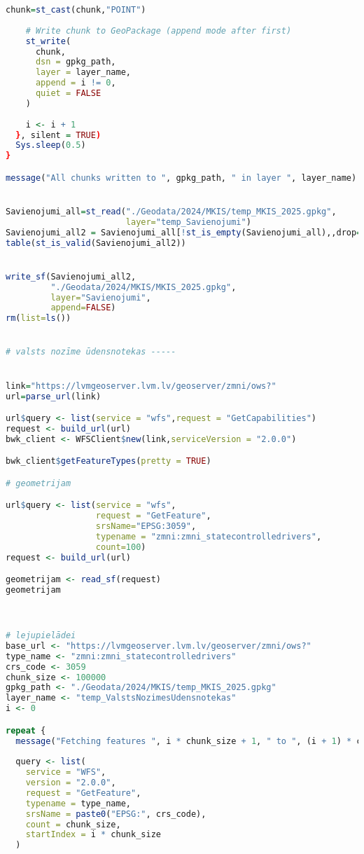 \documentclass[
]{book}
\begin{document}
\begin{lstlisting}[language=R]
    chunk=st_cast(chunk,"POINT")
    
    # Write chunk to GeoPackage (append mode after first)
    st_write(
      chunk, 
      dsn = gpkg_path,
      layer = layer_name,
      append = i != 0,
      quiet = FALSE
    )
    
    i <- i + 1
  }, silent = TRUE)
  Sys.sleep(0.5)
}

message("All chunks written to ", gpkg_path, " in layer ", layer_name)


Savienojumi_all=st_read("./Geodata/2024/MKIS/temp_MKIS_2025.gpkg",
                        layer="temp_Savienojumi")
Savienojumi_all2 = Savienojumi_all[!st_is_empty(Savienojumi_all),,drop=FALSE] # 0
table(st_is_valid(Savienojumi_all2))


write_sf(Savienojumi_all2,
         "./Geodata/2024/MKIS/MKIS_2025.gpkg",
         layer="Savienojumi",
         append=FALSE)
rm(list=ls())


# valsts nozīme ūdensnotekas -----


link="https://lvmgeoserver.lvm.lv/geoserver/zmni/ows?"
url=parse_url(link)

url$query <- list(service = "wfs",request = "GetCapabilities")
request <- build_url(url)
bwk_client <- WFSClient$new(link,serviceVersion = "2.0.0")

bwk_client$getFeatureTypes(pretty = TRUE)

# geometrijam

url$query <- list(service = "wfs",
                  request = "GetFeature",
                  srsName="EPSG:3059",
                  typename = "zmni:zmni_statecontrolledrivers",
                  count=100)
request <- build_url(url)

geometrijam <- read_sf(request)
geometrijam



# lejupielādei
base_url <- "https://lvmgeoserver.lvm.lv/geoserver/zmni/ows?"
type_name <- "zmni:zmni_statecontrolledrivers"
crs_code <- 3059
chunk_size <- 100000
gpkg_path <- "./Geodata/2024/MKIS/temp_MKIS_2025.gpkg"
layer_name <- "temp_ValstsNozimesUdensnotekas"
i <- 0

repeat {
  message("Fetching features ", i * chunk_size + 1, " to ", (i + 1) * chunk_size, "...")
  
  query <- list(
    service = "WFS",
    version = "2.0.0",
    request = "GetFeature",
    typename = type_name,
    srsName = paste0("EPSG:", crs_code),
    count = chunk_size,
    startIndex = i * chunk_size
  )
  

\end{lstlisting}
\end{document}
